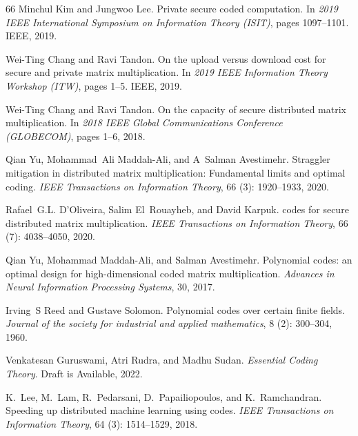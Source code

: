 \documentclass{article}
\begin{document}
\begin{thebibliography}{66}
Minchul Kim and Jungwoo Lee.
\newblock Private secure coded computation.
\newblock In \emph{2019 IEEE International Symposium on Information Theory (ISIT)}, pages 1097--1101. IEEE, 2019.

Wei-Ting Chang and Ravi Tandon.
\newblock On the upload versus download cost for secure and private matrix multiplication.
\newblock In \emph{2019 IEEE Information Theory Workshop (ITW)}, pages 1--5. IEEE, 2019.

Wei-Ting Chang and Ravi Tandon.
\newblock On the capacity of secure distributed matrix multiplication.
\newblock In \emph{2018 IEEE Global Communications Conference (GLOBECOM)}, pages 1--6, 2018.

Qian Yu, Mohammad~Ali Maddah-Ali, and A~Salman Avestimehr.
\newblock Straggler mitigation in distributed matrix multiplication: Fundamental limits and optimal coding.
\newblock \emph{IEEE Transactions on Information Theory}, 66 (3): 1920--1933, 2020{}.

Rafael~G.L. D’Oliveira, Salim El~Rouayheb, and David Karpuk.
 codes for secure distributed matrix multiplication.
\newblock \emph{IEEE Transactions on Information Theory}, 66 (7): 4038--4050, 2020.

Qian Yu, Mohammad Maddah-Ali, and Salman Avestimehr.
\newblock Polynomial codes: an optimal design for high-dimensional coded matrix multiplication.
\newblock \emph{Advances in Neural Information Processing Systems}, 30, 2017.

Irving~S Reed and Gustave Solomon.
\newblock Polynomial codes over certain finite fields.
\newblock \emph{Journal of the society for industrial and applied mathematics}, 8 (2): 300--304, 1960.

Venkatesan Guruswami, Atri Rudra, and Madhu Sudan.
\newblock \emph{Essential Coding Theory}.
\newblock Draft is Available, 2022.

K.~Lee, M.~Lam, R.~Pedarsani, D.~Papailiopoulos, and K.~Ramchandran.
\newblock Speeding up distributed machine learning using codes.
\newblock \emph{IEEE Transactions on Information Theory}, 64 (3): 1514--1529, 2018.


\end{thebibliography}
\end{document}
